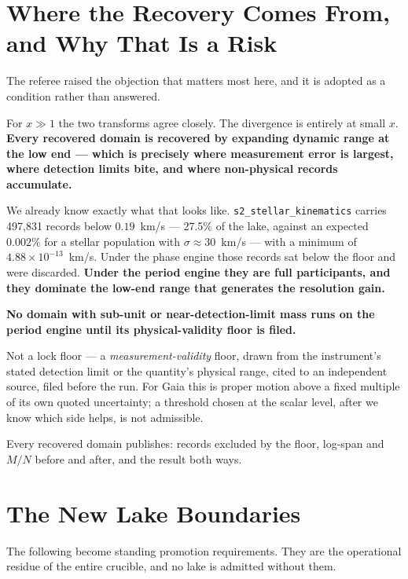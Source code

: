 \documentclass[11pt, letterpaper, openany]{book}
\begin{document}
\section{Where the Recovery Comes From, and Why That Is a Risk}

The referee raised the objection that matters most here, and it is adopted as a condition rather
than answered.

For $x \gg 1$ the two transforms agree closely. The divergence is entirely at small $x$.
\textbf{Every recovered domain is recovered by expanding dynamic range at the low end --- which
is precisely where measurement error is largest, where detection limits bite, and where
non-physical records accumulate.}

We already know exactly what that looks like. \texttt{s2\_stellar\_kinematics} carries 497{,}831
records below $0.19$~km/s --- 27.5\% of the lake, against an expected $0.002\%$ for a stellar
population with $\sigma \approx 30$~km/s --- with a minimum of $4.88\times10^{-13}$~km/s. Under
the phase engine those records sat below the floor and were discarded. \textbf{Under the period
engine they are full participants, and they dominate the low-end range that generates the
resolution gain.}

\begin{rulingbox}
\textbf{No domain with sub-unit or near-detection-limit mass runs on the period engine until its
physical-validity floor is filed.}

\medskip
\noindent Not a lock floor --- a \emph{measurement-validity} floor, drawn from the instrument's
stated detection limit or the quantity's physical range, cited to an independent source, filed
before the run. For Gaia this is proper motion above a fixed multiple of its own quoted
uncertainty; a threshold chosen at the scalar level, after we know which side helps, is not
admissible.

\medskip
\noindent Every recovered domain publishes: records excluded by the floor, log-span and $M/N$
before and after, and the result both ways.
\end{rulingbox}

\section{The New Lake Boundaries}

The following become standing promotion requirements. They are the operational residue of the
entire crucible, and no lake is admitted without them.
\end{document}
